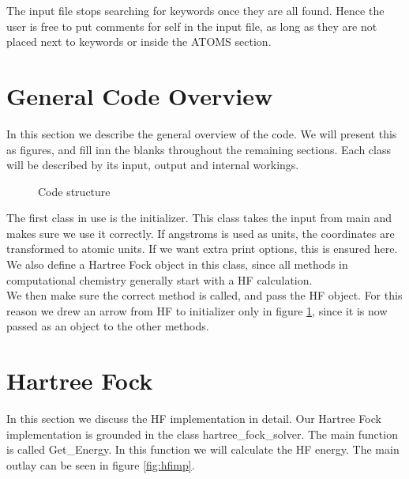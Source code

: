 \documentclass[a4paper,norsk,11pt,twoside]{report}
\begin{document}
The input file stops searching for keywords once they are all found. Hence the user is free to put comments for self in the input file, as long as they are not placed next to keywords or inside the ATOMS section.

\section{General Code Overview}
In this section we describe the general overview of the code. We will present this as figures, and fill inn the blanks throughout the remaining sections. Each class will be described by its input, output and internal workings. \\

\begin{figure}[h!]
\begin{center}
\caption{Code structure}
\label{fig:structure}
\end{center}
\end{figure}

The first class in use is the initializer. This class takes the input from main and makes sure we use it correctly. If angstroms is used as units, the coordinates are transformed to atomic units. If we want extra print options, this is ensured here. We also define a Hartree Fock object in this class, since all methods in computational chemistry generally start with a HF calculation. \\

We then make sure the correct method is called, and pass the HF object. For this reason we drew an arrow from HF to initializer only in figure \ref{fig:structure}, since it is now passed as an object to the other methods. 


\section{Hartree Fock}
In this section we discuss the HF implementation in detail. Our Hartree Fock implementation is grounded in the class hartree\_fock\_solver. The main function is called Get\_Energy. In this function we will calculate the HF energy. The main outlay can be seen in figure \ref{fig:hfimp}. \\

\newpage
\end{document}
